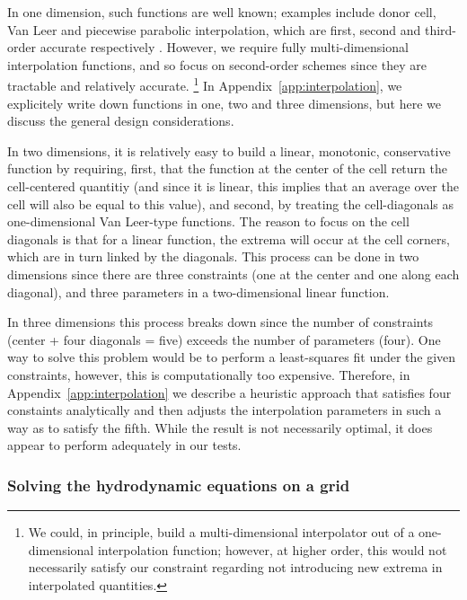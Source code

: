 In one dimension, such functions are well known; examples include
donor cell, Van Leer and piecewise parabolic interpolation, which are
first, second and third-order accurate respectively
\citep[e.g.,][]{Stone92a}.  However, we require fully
multi-dimensional interpolation functions, and so focus on
second-order schemes since they are tractable and relatively accurate.
\footnote{We could, in principle, build a multi-dimensional
  interpolator out of a one-dimensional interpolation function;
  however, at higher order, this would not necessarily satisfy our
  constraint regarding not introducing new extrema in interpolated quantities.}  In Appendix~\ref{app:interpolation}, we
explicitely write down functions in one, two and three dimensions, but
here we discuss the general design considerations.

In two dimensions, it is relatively easy to build a linear, monotonic,
conservative function by requiring, first, that the function at the
center of the cell return the cell-centered quantitiy (and since it is
linear, this implies that an average over the cell will also be equal
to this value), and second, by treating the cell-diagonals as
one-dimensional Van Leer-type functions.  The reason to focus on the
cell diagonals is that for a linear function, the extrema will occur at the cell 
corners, which are in turn linked by the diagonals.  This process can be done in
two dimensions since there are three constraints (one at the center and one along
each diagonal), and three parameters in a two-dimensional linear
function.

In three dimensions this process breaks down since the number of
constraints (center + four diagonals = five) exceeds the number of
parameters (four).  One way to solve this problem would be to perform
a least-squares fit under the given constraints, however, this is
computationally too expensive.  Therefore, in Appendix~\ref{app:interpolation} we describe
a heuristic approach that satisfies four constaints analytically and
then adjusts the interpolation parameters in such a way as to satisfy the fifth.
While the result is not necessarily optimal, it does appear to perform
adequately in our tests.


\subsubsection{Solving the hydrodynamic equations on a grid}
\label{sec:solve_hydro}


